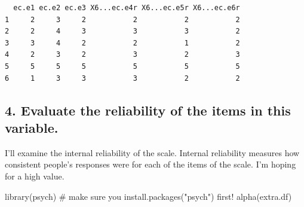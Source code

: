 \documentclass[
  letterpaper,
  DIV=11,
  numbers=noendperiod,
  oneside]{scrreprt}
\newenvironment{Shaded}{\begin{snugshade}}{\end{snugshade}}
\newcommand{\CommentTok}[1]{\textcolor[rgb]{0.37,0.37,0.37}{#1}}
\newcommand{\FunctionTok}[1]{\textcolor[rgb]{0.28,0.35,0.67}{#1}}
\newcommand{\NormalTok}[1]{\textcolor[rgb]{0.00,0.23,0.31}{#1}}
\begin{document}
\begin{verbatim}
  ec.e1 ec.e2 ec.e3 X6...ec.e4r X6...ec.e5r X6...ec.e6r
1     2     3     2           2           2           2
2     2     4     3           3           3           2
3     3     4     2           2           1           2
4     2     3     2           3           2           3
5     5     5     5           5           5           5
6     1     3     3           3           2           2
\end{verbatim}

\subsection{4. Evaluate the reliability of the items in this
variable.}\label{evaluate-the-reliability-of-the-items-in-this-variable.}

I'll examine the internal reliability of the scale. Internal reliability
measures how consistent people's responses were for each of the items of
the scale. I'm hoping for a high value.

\begin{Shaded}
\begin{Highlighting}[]
\FunctionTok{library}\NormalTok{(psych) }\CommentTok{\# make sure you install.packages("psych") first!}
\FunctionTok{alpha}\NormalTok{(extra.df)}
\end{Highlighting}
\end{Shaded}
\end{document}
